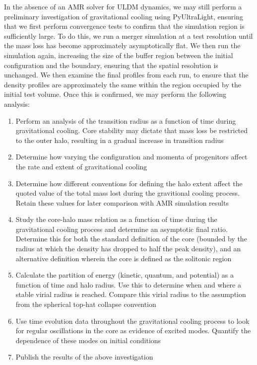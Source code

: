 In the absence of an AMR solver for ULDM dynamics, we may still perform a preliminary investigation of gravitational cooling using PyUltraLight, ensuring that we first perform convergence tests to confirm that the simulation region is sufficiently large. To do this, we run a merger simulation at a test resolution until the mass loss has become approximately asymptotically flat. We then run the simulation again, increasing the size of the buffer region between the initial configuration and the boundary, ensuring that the spatial resolution is unchanged. We then examine the final profiles from each run, to ensure that the density profiles are approximately the same within the region occupied by the initial test volume. Once this is confirmed, we may perform the following analysis:
\begin{enumerate}
    \item Perform an analysis of the transition radius as a function of time during gravitational cooling. Core stability may dictate that mass loss be restricted to the outer halo, resulting in a gradual increase in transition radius
    \item Determine how varying the configuration and momenta of progenitors affect the rate and extent of gravitational cooling
    \item Determine how different conventions for defining the halo extent affect the quoted value of the total mass lost during the gravitional cooling process. Retain these values for later comparison with AMR simulation results
    \item Study the core-halo mass relation as a function of time during the gravitational cooling process and determine an asymptotic final ratio. Determine this for both the standard definition of the core (bounded by the radius at which the density has dropped to half the peak density), and an alternative definition wherein the core is defined as the solitonic region
    \item Calculate the partition of energy (kinetic, quantum, and potential) as a function of time and halo radius. Use this to determine when and where a stable virial radius is reached. Compare this virial radius to the assumption from the spherical top-hat collapse convention
    \item Use time evolution data throughout the gravitational cooling process to look for regular oscillations in the core as evidence of excited modes. Quantify the dependence of these modes on initial conditions 
    \item Publish the results of the above investigation
\end{enumerate}



